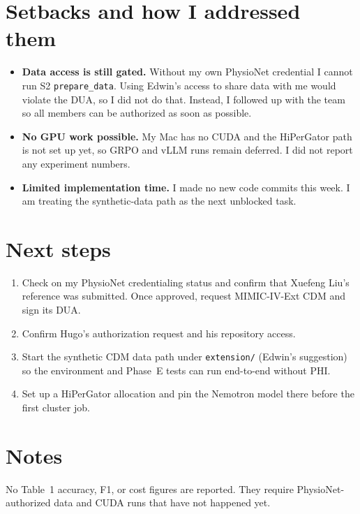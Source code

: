 \documentclass[11pt,letterpaper]{article}
\begin{document}
\section{Setbacks and how I addressed them}
\begin{itemize}
  \item \textbf{Data access is still gated.} Without my own PhysioNet credential I cannot run S2 \texttt{prepare\_data}. Using Edwin's access to share data with me would violate the DUA, so I did not do that. Instead, I followed up with the team so all members can be authorized as soon as possible.
  \item \textbf{No GPU work possible.} My Mac has no CUDA and the HiPerGator path is not set up yet, so GRPO and vLLM runs remain deferred. I did not report any experiment numbers.
  \item \textbf{Limited implementation time.} I made no new code commits this week. I am treating the synthetic-data path as the next unblocked task.
\end{itemize}

\section{Next steps}
\begin{enumerate}
  \item Check on my PhysioNet credentialing status and confirm that Xuefeng Liu's reference was submitted. Once approved, request MIMIC-IV-Ext CDM and sign its DUA.
  \item Confirm Hugo's authorization request and his repository access.
  \item Start the synthetic CDM data path under \texttt{extension/} (Edwin's suggestion) so the environment and Phase~E tests can run end-to-end without PHI.
  \item Set up a HiPerGator allocation and pin the Nemotron model there before the first cluster job.
\end{enumerate}

\section*{Notes}
No Table~1 accuracy, F1, or cost figures are reported. They require PhysioNet-authorized data and CUDA runs that have not happened yet.
\end{document}
